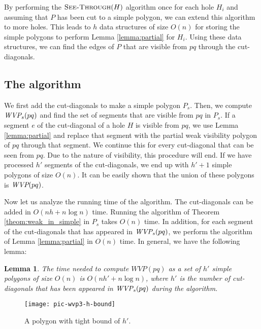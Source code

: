 \documentclass[5p]{elsarticle}
\newtheorem{lemma}[theorem]{Lemma}
\def\WVP{\mbox{\it{WVP}}}
\def\P{\mbox{${P}$}}
\def\SeeThrough{\mbox{\textsc{See-Through}}}
\begin{document}
By performing the $\SeeThrough(H)$ algorithm once for each hole $H_i$ and assuming that $\P$
has been cut to a simple polygon, we can extend this algorithm to more holes.
This leads to $h$ data structures of size $O(n)$ for storing the simple polygons to
perform Lemma \ref{lemma:partial} for $H_i$.
Using these data structures, we can find the edges of $\P$ that
are visible from $pq$ through the cut-diagonals. 



\subsection{The algorithm}
\label{sec:wv3:main-algorithm}
We first add the cut-diagonals to make a simple polygon $\P_s$. 
Then, we compute $\WVP_s(pq)$ and find the set of segments that
are visible from $pq$ in $\P_s$. If a segment $e$ of the cut-diagonal of a hole $H$ is visible 
from $pq$, we use Lemma \ref{lemma:partial} and replace that segment with the partial
weak visibility polygon of $pq$ through that segment. 
We continue this for every cut-diagonal that can be seen from $pq$.
Due to the nature of visibility, this procedure will end. If we have processed $h'$ 
segments of the cut-diagonals, we end up with $h' + 1$ simple polygons of size $O(n)$. It can 
be easily shown that the union of these polygons is $\WVP(pq)$.

Now let us analyze the running time of the algorithm. 
The cut-diagonals can be added in $O(nh+ n\log n)$ time.
Running the algorithm of Theorem \ref{theom:weak_in_simple} in $\P_s$
takes $O(n)$ time. In addition, for each segment of the cut-diagonals that has appeared in $\WVP_s(pq)$, 
we perform the algorithm of Lemma \ref{lemma:partial} in $O(n)$ time.
In general, we have the following lemma:



\begin{lemma}
\label{lemma:wvp3:primary-result}
The time needed to compute $WVP(pq)$ as a set of $h'$ simple polygons
of size $O(n)$ is $O(nh' + n \log n)$, where $h'$ is the
number of cut-diagonals that has been appeared in $\WVP_s(pq)$ 
during the algorithm.
\end{lemma}


\begin{figure}[h]
  \centering
  \texttt{[image: pic-wvp3-h-bound]} 
  \caption{A polygon with tight bound of $h'$.}
  \label{fig:wvp3-h-bound}
\end{figure}
\end{document}
